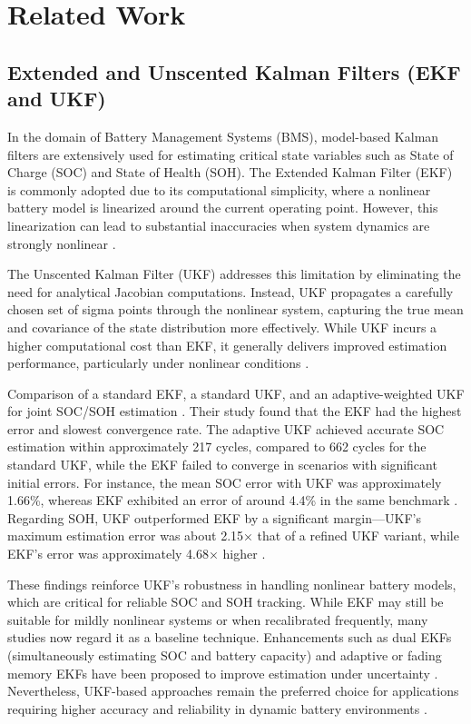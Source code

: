 \section{Related Work}
\subsection{Extended and Unscented Kalman Filters (EKF and UKF)}

In the domain of Battery Management Systems (BMS), model-based Kalman filters are extensively used for estimating critical state variables such as State of Charge (SOC) and State of Health (SOH). The Extended Kalman Filter (EKF) is commonly adopted due to its computational simplicity, where a nonlinear battery model is linearized around the current operating point. However, this linearization can lead to substantial inaccuracies when system dynamics are strongly nonlinear \cite{GUO2024113850}.

The Unscented Kalman Filter (UKF) addresses this limitation by eliminating the need for analytical Jacobian computations. Instead, UKF propagates a carefully chosen set of sigma points through the nonlinear system, capturing the true mean and covariance of the state distribution more effectively. While UKF incurs a higher computational cost than EKF, it generally delivers improved estimation performance, particularly under nonlinear conditions \cite{GUO2024113850}.

Comparison of a standard EKF, a standard UKF, and an adaptive-weighted UKF for joint SOC/SOH estimation \cite{en17092145}. Their study found that the EKF had the highest error and slowest convergence rate. The adaptive UKF achieved accurate SOC estimation within approximately 217 cycles, compared to 662 cycles for the standard UKF, while the EKF failed to converge in scenarios with significant initial errors. For instance, the mean SOC error with UKF was approximately 1.66\%, whereas EKF exhibited an error of around 4.4\% in the same benchmark \cite{en6105088}. Regarding SOH, UKF outperformed EKF by a significant margin—UKF's maximum estimation error was about 2.15× that of a refined UKF variant, while EKF’s error was approximately 4.68× higher \cite{en17092145}.

These findings reinforce UKF’s robustness in handling nonlinear battery models, which are critical for reliable SOC and SOH tracking. While EKF may still be suitable for mildly nonlinear systems or when recalibrated frequently, many studies now regard it as a baseline technique. Enhancements such as dual EKFs (simultaneously estimating SOC and battery capacity) and adaptive or fading memory EKFs have been proposed to improve estimation under uncertainty \cite{GUO2024113850}. Nevertheless, UKF-based approaches remain the preferred choice for applications requiring higher accuracy and reliability in dynamic battery environments \cite{GUO2024113850}.

